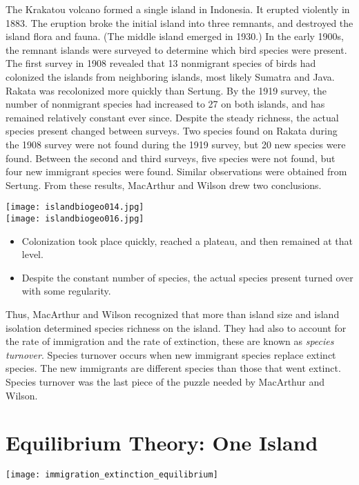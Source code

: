 \documentclass[letterpaper]{tufte-handout}
\begin{document}
The Krakatou volcano formed a single island in Indonesia.  It erupted violently in 1883.  The eruption broke the initial island into three remnants, and destroyed the island flora and fauna. (The middle island emerged in 1930.) In the early 1900s, the remnant islands were surveyed to determine which bird species were present.
The first survey in 1908 revealed that 13 nonmigrant species of birds had colonized the islands from neighboring islands, most likely Sumatra and Java.  Rakata was recolonized more quickly than Sertung. By the 1919 survey, the number of nonmigrant species had increased to 27 on both islands, and has remained relatively constant ever since. Despite the steady richness, the actual species present changed between surveys. Two species found on Rakata during the 1908 survey were not found during the 1919 survey, but 20 new species were found. Between the second and third surveys, five species were not found, but four new immigrant species were found. Similar observations were obtained from Sertung. From these results, MacArthur and Wilson drew two conclusions.
\begin{marginfigure}%
	\centering
	\texttt{[image: islandbiogeo014.jpg]}\\
	\texttt{[image: islandbiogeo016.jpg]}
\end{marginfigure} 
\begin{itemize}
	\item Colonization took place quickly, reached a plateau, and then remained at that level.  
	\item Despite the constant number of species, the actual species present turned over with some regularity.
\end{itemize}

Thus, MacArthur and Wilson recognized that more than island size and island isolation determined species richness on the island.  They had also to account for the rate of immigration and the rate of extinction, these are known as \textit{species turnover}. Species turnover occurs when new immigrant species replace extinct species. The new immigrants are different species than those that went extinct.  Species turnover was the last piece of the puzzle needed by MacArthur and Wilson.

\section{Equilibrium Theory: One Island}
\begin{marginfigure}%
	\centering
	\texttt{[image: immigration\_extinction\_equilibrium]}
\end{marginfigure} 
\end{document}
